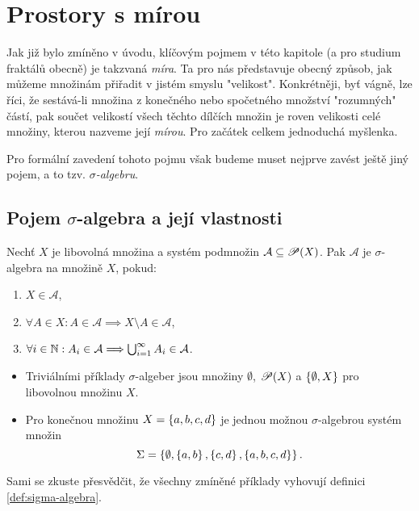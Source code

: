 \section{Prostory s mírou}\label{sec:prostory-s-mirou}

Jak již bylo zmíněno v úvodu, klíčovým pojmem v této kapitole (a pro studium fraktálů obecně) je takzvaná \emph{míra}. Ta pro nás představuje obecný způsob, jak můžeme množinám přiřadit v jistém smyslu "velikost". Konkrétněji, byť vágně, lze říci, že sestává-li množina z konečného nebo spočetného množství "rozumných" částí, pak součet velikostí všech těchto dílčích množin je roven velikosti celé množiny, kterou nazveme její \emph{mírou}. Pro začátek celkem jednoduchá myšlenka.

Pro formální zavedení tohoto pojmu však budeme muset nejprve zavést ještě jiný pojem, a to tzv. \emph{$\sigma$-algebru}.

\subsection{Pojem $\sigma$-algebra a její vlastnosti}\label{subsec:sigma-algebra}

\begin{definition}\label{def:sigma-algebra}
    Nechť $X$ je libovolná množina a systém podmnožin $\mathcal{A}\subseteq\mathscr{P}(X)$. Pak $\mathcal{A}$ je $\sigma$-algebra na množině $X$, pokud:
    \begin{enumerate}[label=(\roman*)]
        \item\label{def:sigma-algebra-podm1} $X\in\mathcal{A}$,
        \item\label{def:sigma-algebra-podm2} $\forall A\in X: A\in\mathcal{A}\implies X\setminus A\in\mathcal{A}$,
        \item\label{def:sigma-algebra-podm3} $\forall i\in\mathbb{N}: A_i\in\mathcal{A}\Longrightarrow\bigcup_{i=1}^\infty A_i\in\mathcal{A}$.
    \end{enumerate}
\end{definition}

\begin{example}
    \begin{itemize}
        \item Triviálními příklady $\sigma$-algeber jsou množiny $\emptyset$, $\mathscr{P}(X)$ a $\left\{\emptyset,X\right\}$ pro libovolnou množinu $X$.
        \item Pro konečnou množinu $X=\left\{a,b,c,d\right\}$ je jednou možnou $\sigma$-algebrou systém množin
        \[\Sigma=\left\{\emptyset,\left\{a,b\right\},\left\{c,d\right\},\left\{a,b,c,d\right\}\right\}.\]
    \end{itemize}
    Sami se zkuste přesvědčit, že všechny zmíněné příklady vyhovují definici \ref{def:sigma-algebra}.
\end{example}

